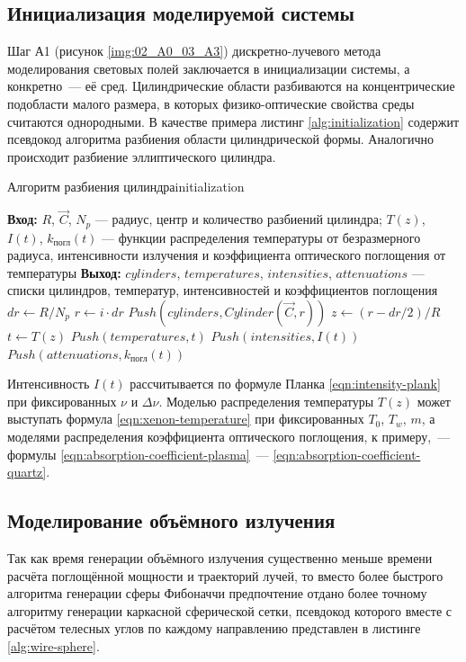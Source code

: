 \subsection{Инициализация моделируемой системы}

Шаг А1 (рисунок \ref{img:02_A0_03_A3}) дискретно-лучевого метода моделирования световых полей заключается в инициализации системы, а конкретно~— её сред. Цилиндрические области разбиваются на концентрические подобласти малого размера, в которых физико-оптические свойства среды считаются однородными. В качестве примера листинг \ref{alg:initialization} содержит псевдокод алгоритма разбиения области цилиндрической формы.
Аналогично происходит разбиение эллиптического цилиндра.

\begin{Algorithm}{Алгоритм разбиения цилиндра}{initialization}
	\begin{algorithmic}[1]
		\State \textbf{Вход:} $R$, $\vec C$, $N_p$ — радиус, центр и количество разбиений цилиндра; $T(z)$, $I(t)$, $k_{\text{погл}}(t)$ — функции распределения температуры от безразмерного радиуса, интенсивности излучения и коэффициента оптического поглощения от температуры
		\State \textbf{Выход:} $cylinders$, $temperatures$, $intensities$, $attenuations$ — списки цилиндров, температур, интенсивностей и коэффициентов поглощения
		\State $dr \gets R / N_p$
			\State $r \gets i \cdot dr$
			\State $Push(cylinders, Cylinder(\vec C, r))$
			\State $z \gets (r - dr / 2) / R$
			\State $t \gets T(z)$
			\State $Push(temperatures, t)$
			\State $Push(intensities, I(t))$
			\State $Push(attenuations, k_{\text{погл}}(t))$
		\EndFor
	\end{algorithmic}
\end{Algorithm}

Интенсивность $I(t)$ рассчитывается по формуле Планка \eqref{eqn:intensity-plank} при фиксированных $\nu$ и $\Delta\nu$.
Моделью распределения температуры $T(z)$ может выступать формула \eqref{eqn:xenon-temperature} при фиксированных $T_0$, $T_w$, $m$, а моделями распределения коэффициента оптического поглощения, к примеру,~— формулы \eqref{eqn:absorption-coefficient-plasma}~— \eqref{eqn:absorption-coefficient-quartz}.

\subsection{Моделирование объёмного излучения}

Так как время генерации объёмного излучения существенно меньше времени расчёта поглощённой мощности и траекторий лучей, то вместо более быстрого алгоритма генерации сферы Фибоначчи предпочтение отдано более точному алгоритму генерации каркасной сферической сетки, псевдокод которого вместе с расчётом телесных углов по каждому направлению представлен в листинге \ref{alg:wire-sphere}.

